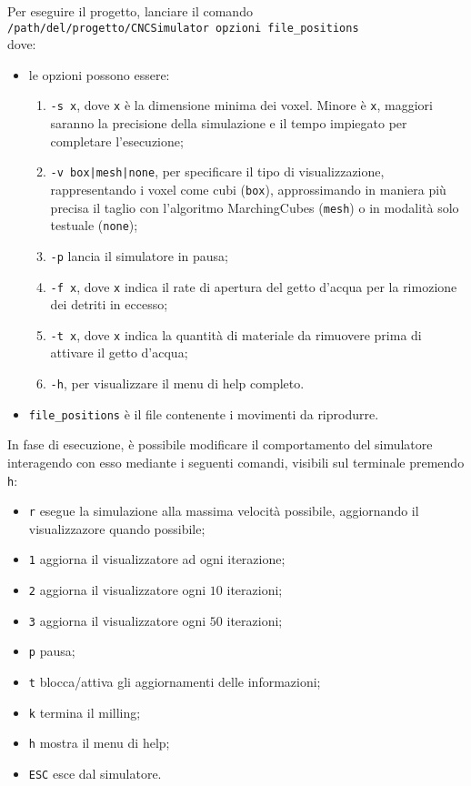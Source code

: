 Per eseguire il progetto, lanciare il comando\\ \verb!/path/del/progetto/CNCSimulator opzioni file_positions!\\ dove:
\begin{itemize}
  \item le opzioni possono essere:
    \begin{enumerate}[noitemsep]
      \item \verb!-s x!, dove \verb!x! è la dimensione minima dei voxel. Minore è \verb!x!, maggiori saranno la precisione della simulazione e il tempo impiegato per completare l'esecuzione;
      \item \verb!-v box|mesh|none!, per specificare il tipo di visualizzazione, rappresentando i voxel come cubi (\texttt{box}), approssimando in maniera più precisa il taglio con l'algoritmo MarchingCubes (\texttt{mesh}) o in modalità solo testuale (\texttt{none});
      \item \verb!-p! lancia il simulatore in pausa;
      \item \verb!-f x!, dove \verb!x! indica il rate di apertura del getto d'acqua per la rimozione dei detriti in eccesso;
      \item \verb!-t x!, dove \verb!x! indica la quantità di materiale da rimuovere prima di attivare il getto d'acqua;
      \item \verb!-h!, per visualizzare il menu di help completo.
    \end{enumerate}
  \item \verb!file_positions! è il file contenente i movimenti da riprodurre.
\end{itemize}

In fase di esecuzione, è possibile modificare il comportamento del simulatore interagendo con esso mediante i seguenti comandi, visibili sul terminale premendo \texttt{h}:
\begin{itemize}[noitemsep]
  \item \verb'r'		esegue la simulazione alla massima velocità possibile, aggiornando il visualizzazore quando possibile;
  \item \verb'1'		aggiorna il visualizzatore ad ogni iterazione;
  \item \verb'2'		aggiorna il visualizzatore ogni $10$ iterazioni;
  \item \verb'3'		aggiorna il visualizzatore ogni $50$ iterazioni;
  \item \verb'p'		pausa;
  \item \verb't'		blocca/attiva gli aggiornamenti delle informazioni;
  \item \verb'k'		termina il milling;
  \item \verb'h'		mostra il menu di help;
  \item \verb'ESC'	esce dal simulatore.
\end{itemize}
